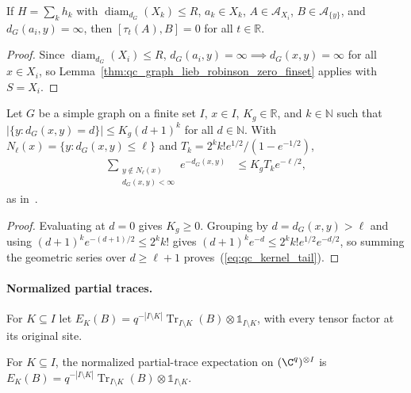\begin{lemma}
    \label{thm:qc_graph_lieb_robinson_zero}
    \leanok
    If $H=\sum_kh_k$ with $\operatorname{diam}_{d_G}(X_k)\le R$, $a_k\in X_k$, $A\in\mathcal A_{X_i}$, $B\in\mathcal A_{\{y\}}$, and $d_G(a_i,y)=\infty$, then $[\tau_t(A),B]=0$ for all $t\in\mathbb R$.
\end{lemma}
\begin{proof}\leanok
    Since $\operatorname{diam}_{d_G}(X_i)\le R$, $d_G(a_i,y)=\infty\implies d_G(x,y)=\infty$ for all $x\in X_i$, so Lemma~\ref{thm:qc_graph_lieb_robinson_zero_finset} applies with $S=X_i$.
\end{proof}

\begin{lemma}
    \label{lem:qc_graph_kernel_tail}
    \leanok
    Let $G$ be a simple graph on a finite set $I$, $x\in I$, $K_g\in\mathbb R$, and $k\in\mathbb N$ such that $|\{y:d_G(x,y)=d\}|\le K_g(d+1)^k$ for all $d\in\mathbb N$. With $N_\ell(x)=\{y:d_G(x,y)\leq\ell\}$ and $T_k=2^kk!e^{1/2}/(1-e^{-1/2})$,
    \begin{align}
        \sum_{\substack{y\notin N_\ell(x) \\d_G(x,y)<\infty}}
        e^{-d_G(x,y)}
         & \leq K_gT_ke^{-\ell/2},
        \label{eq:qc_kernel_tail}
    \end{align}
    as in~\cite[Lemma~4.1]{OpenAI2026AreaLaw}.
\end{lemma}
\begin{proof}
    \leanok
    Evaluating at $d=0$ gives $K_g\ge0$. Grouping by $d=d_G(x,y)>\ell$ and using $(d+1)^ke^{-(d+1)/2}\le 2^kk!$ gives $(d+1)^ke^{-d}\le 2^kk!e^{1/2}e^{-d/2}$, so summing the geometric series over $d\ge\ell+1$ proves~(\ref{eq:qc_kernel_tail}).
\end{proof}

\paragraph{Normalized partial traces.}
For $K\subseteq I$ let
$E_K(B)=q^{-|I\setminus K|}\operatorname{Tr}_{I\setminus K}(B)\otimes\mathbb 1_{I\setminus K}$,
with every tensor factor at its original site.

\begin{definition}
    \label{def:qc_site_expectation}
    \leanok
    For $K\subseteq I$, the normalized partial-trace expectation on
    $(\C^q)^{\otimes I}$ is $E_K(B)=q^{-|I\setminus K|}\operatorname{Tr}_{I\setminus K}(B)\otimes\mathbb 1_{I\setminus K}$.
\end{definition}

